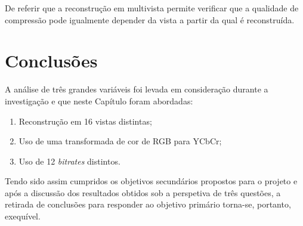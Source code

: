 De referir que a reconstrução em multivista permite verificar que a qualidade de compressão pode igualmente depender da vista a partir da qual é reconstruída.





\section{Conclusões}
\label{sec::test-result:conclusao}

A análise de três grandes variáveis foi levada em consideração durante a investigação e que neste Capítulo foram abordadas:
\begin{enumerate}
    \item Reconstrução em 16 vistas distintas;
    \item Uso de uma transformada de cor de \ac{RGB} para YCbCr;
    \item Uso de 12 \textit{bitrates} distintos.
\end{enumerate}

Tendo sido assim cumpridos os objetivos secundários propostos para o projeto e após a discussão dos resultados obtidos sob a perspetiva de três questões, a retirada de conclusões para responder ao objetivo primário torna-se, portanto, exequível.
